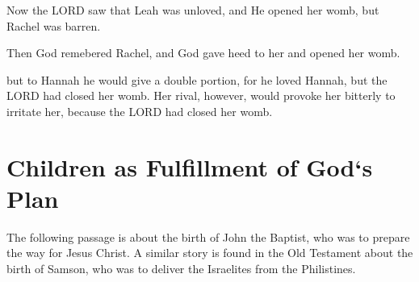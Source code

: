 \vspace{2\baselineskip}

\begin{scripture}[Genesis 29:31]
    Now the LORD saw that Leah was unloved, and He opened her womb, but Rachel was barren.
\end{scripture}

\vspace{2\baselineskip}

\begin{scripture}[Genesis 30:22]
    Then God remebered Rachel, and God gave heed to her and opened her womb.
\end{scripture}

\vspace{2\baselineskip}

\begin{scripture}[1 Samuel 1:5-6]
    but to Hannah he would give a double portion, for he loved Hannah, but the LORD had closed her womb.
    Her rival, however, would provoke her bitterly to irritate her, because the LORD had closed her womb.
\end{scripture}


\vspace{2\baselineskip}


\newpage
\section{Children as Fulfillment of God`s Plan}

The following passage is about the birth of John the Baptist, who was to prepare the way for Jesus Christ. A similar story is found in the Old Testament about the birth of Samson, who was to deliver
the Israelites from the Philistines.
\vspace{1\baselineskip}

